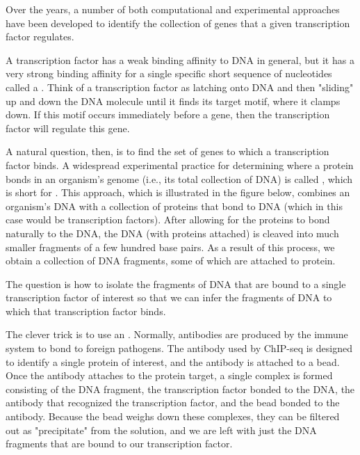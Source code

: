 Over the years, a number of both computational and experimental approaches have been developed to identify the collection of genes that a given transcription factor regulates.

A transcription factor has a weak binding affinity to DNA in general, but it has a very strong binding affinity for a single specific short sequence of nucleotides called a . Think of a transcription factor as latching onto DNA and then "sliding" up and down the DNA molecule until it finds its target motif, where it clamps down. If this motif occurs immediately before a gene, then the transcription factor will regulate this gene.

A natural question, then, is to find the set of genes to which a transcription factor binds. A widespread experimental practice for determining where a protein bonds in an organism's genome (i.e., its total collection of DNA) is called , which is short for . This approach, which is illustrated in the figure below, combines an organism's DNA with a collection of proteins that bond to DNA (which in this case would be transcription factors). After allowing for the proteins to bond naturally to the DNA, the DNA (with proteins attached) is cleaved into much smaller fragments of a few hundred base pairs. As a result of this process, we obtain a collection of DNA fragments, some of which are attached to protein.

The question is how to isolate the fragments of DNA that are bound to a single transcription factor of interest so that we can infer the fragments of DNA to which that transcription factor binds.

The clever trick is to use an . Normally, antibodies are produced by the immune system to bond to foreign pathogens. The antibody used by ChIP-seq is designed to identify a single protein of interest, and the antibody is attached to a bead. Once the antibody attaches to the protein target, a single complex is formed consisting of the DNA fragment, the transcription factor bonded to the DNA, the antibody that recognized the transcription factor, and the bead bonded to the antibody. Because the bead weighs down these complexes, they can be filtered out as "precipitate" from the solution, and we are left with just the DNA fragments that are bound to our transcription factor.

